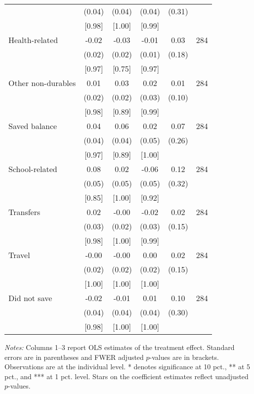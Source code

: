\begin{table}[ht]
{\begin{threeparttable}
\begin{tabular}{l*{5}{c}}
          &   (0.04)&   (0.04)&   (0.04)&   (0.31)&         \\
          &   [0.98]&   [1.00]&   [0.99]&         &         \\
Health-related&    -0.02&-0.03\sym{*}&    -0.01&     0.03&      284\\
          &   (0.02)&   (0.02)&   (0.01)&   (0.18)&         \\
          &   [0.97]&   [0.75]&   [0.97]&         &         \\
Other non-durables&     0.01&     0.03&     0.02&     0.01&      284\\
          &   (0.02)&   (0.02)&   (0.03)&   (0.10)&         \\
          &   [0.98]&   [0.89]&   [0.99]&         &         \\
Saved balance&     0.04&     0.06&     0.02&     0.07&      284\\
          &   (0.04)&   (0.04)&   (0.05)&   (0.26)&         \\
          &   [0.97]&   [0.89]&   [1.00]&         &         \\
School-related&     0.08&     0.02&    -0.06&     0.12&      284\\
          &   (0.05)&   (0.05)&   (0.05)&   (0.32)&         \\
          &   [0.85]&   [1.00]&   [0.92]&         &         \\
Transfers &     0.02&    -0.00&    -0.02&     0.02&      284\\
          &   (0.03)&   (0.02)&   (0.03)&   (0.15)&         \\
          &   [0.98]&   [1.00]&   [0.99]&         &         \\
Travel    &    -0.00&    -0.00&     0.00&     0.02&      284\\
          &   (0.02)&   (0.02)&   (0.02)&   (0.15)&         \\
          &   [1.00]&   [1.00]&   [1.00]&         &         \\
Did not save&    -0.02&    -0.01&     0.01&     0.10&      284\\
          &   (0.04)&   (0.04)&   (0.04)&   (0.30)&         \\
          &   [0.98]&   [1.00]&   [1.00]&         &         \\
\bottomrule \end{tabular} \begin{tablenotes}[flushleft] \footnotesize \item \emph{Notes:} Columns 1--3 report OLS estimates of the treatment effect. Standard errors are in parentheses and FWER adjusted \(p\)-values are in brackets. Observations are at the individual level. * denotes significance at 10 pct., ** at 5 pct., and *** at 1 pct. level. Stars on the coefficient estimates reflect unadjusted \(p\)-values. \end{tablenotes} \end{threeparttable} } \end{table}

